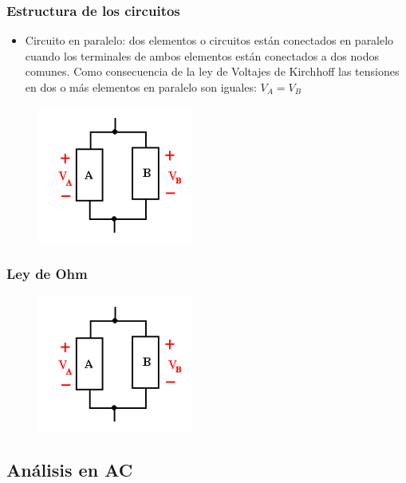 \documentclass{beamer}
\begin{document}
\begin{frame}
\frametitle{Estructura de los circuitos}

\begin{itemize}
\item Circuito en paralelo: dos elementos o circuitos están conectados en paralelo cuando los terminales de ambos elementos están conectados a dos nodos comunes. Como consecuencia de la ley de Voltajes de Kirchhoff las tensiones en dos o más elementos en paralelo son iguales: $V_{A} = V_{B}$
\end{itemize}

\begin{figure}[!h]
\centering
\includegraphics[width=2in]{paralelo}
\end{figure}

\end{frame}

\begin{frame}
\frametitle{Ley de Ohm}

\begin{figure}[!h]
\centering
\includegraphics[width=2in]{paralelo}
\end{figure}
\end{frame}


\begin{frame}
\frametitle{}

\end{frame}

\subsection{Análisis en AC}
\end{document}
